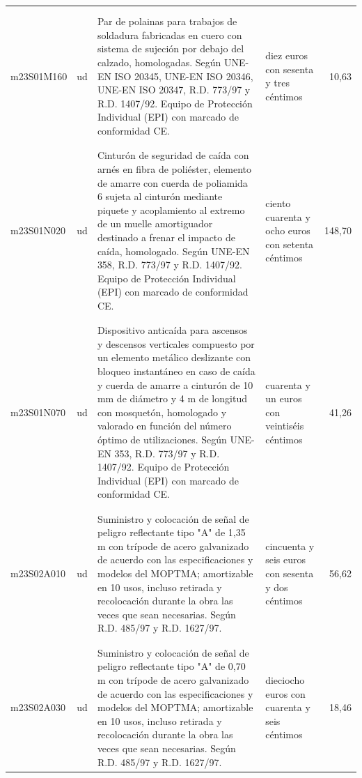 \documentclass{book}%
\begin{document}
\begin{supertabular}{|l|l|p{5cm}|p{3cm}|r|}
&&&&\\%
&&&&\\%
m23S01M160&ud&Par de polainas para trabajos de soldadura fabricadas en cuero con sistema de sujeción por debajo del calzado, homologadas. Según UNE{-}EN ISO 20345, UNE{-}EN ISO 20346, UNE{-}EN ISO 20347, R.D. 773/97 y R.D. 1407/92. Equipo de Protección Individual (EPI) con marcado de conformidad CE.&diez euros con sesenta y tres céntimos&10,63\\%
&&&&\\%
&&&&\\%
m23S01N020&ud&Cinturón de seguridad de caída con arnés en fibra de poliéster, elemento de amarre con cuerda de poliamida 6 sujeta al cinturón mediante piquete y acoplamiento al extremo de un muelle amortiguador destinado a frenar el impacto de caída, homologado. Según UNE{-}EN 358, R.D. 773/97 y R.D. 1407/92. Equipo de Protección Individual (EPI) con marcado de conformidad CE.&ciento cuarenta y ocho euros con setenta céntimos&148,70\\%
&&&&\\%
&&&&\\%
m23S01N070&ud&Dispositivo anticaída para ascensos y descensos verticales compuesto por un elemento metálico deslizante con bloqueo instantáneo en caso de caída y cuerda de amarre a cinturón de 10 mm de diámetro y 4 m de longitud con mosquetón, homologado y valorado en función del número óptimo de utilizaciones. Según UNE{-}EN 353, R.D. 773/97 y R.D. 1407/92. Equipo de Protección Individual (EPI) con marcado de conformidad CE.&cuarenta y un euros con veintiséis céntimos&41,26\\%
&&&&\\%
&&&&\\%
m23S02A010&ud&Suministro y colocación de señal de peligro reflectante tipo "A" de 1,35 m con trípode de acero galvanizado de acuerdo con las especificaciones y modelos del MOPTMA; amortizable en 10 usos, incluso retirada y recolocación durante la obra las veces que sean necesarias. Según R.D. 485/97 y R.D. 1627/97.&cincuenta y seis euros con sesenta y dos céntimos&56,62\\%
&&&&\\%
&&&&\\%
m23S02A030&ud&Suministro y colocación de señal de peligro reflectante tipo "A" de 0,70 m con trípode de acero galvanizado de acuerdo con las especificaciones y modelos del MOPTMA; amortizable en 10 usos, incluso retirada y recolocación durante la obra las veces que sean necesarias. Según R.D. 485/97 y R.D. 1627/97.&dieciocho euros con cuarenta y seis céntimos&18,46\\%

\end{supertabular}
\end{document}

